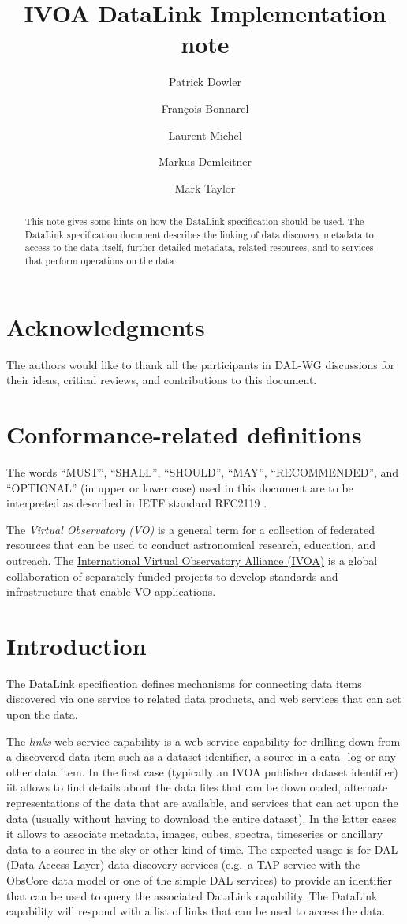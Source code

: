 \documentclass[11pt,a4paper]{ivoa}
\title{IVOA DataLink Implementation note}
\author[http://www.ivoa.net/twiki/bin/view/IVOA/PatrickDowler]
       {Patrick Dowler}
\author[http://www.ivoa.net/twiki/bin/view/IVOA/FrancoisBonnarel]
       {Fran\c{c}ois Bonnarel}
\author[http://www.ivoa.net/twiki/bin/view/IVOA/LaurentMichel]
       {Laurent Michel}
\author[http://www.ivoa.net/twiki/bin/view/IVOA/MarkusDemleitner]
       {Markus Demleitner}
\author[http://www.ivoa.net/twiki/bin/view/IVOA/MarkTaylor]
       {Mark Taylor}
\begin{document}
\begin{abstract}
This note gives some hints on how the DataLink specification should be used.
The DataLink specification document \citep{std:DataLink} describes the linking of data discovery metadata
to access to the data itself, further detailed metadata, related
resources, and to services that perform operations on the data. 
\end{abstract}


\section*{Acknowledgments}

The authors would like to thank all the participants in DAL-WG discussions
for their ideas, critical reviews, and contributions to this document.


\section*{Conformance-related definitions}

The words ``MUST'', ``SHALL'', ``SHOULD'', ``MAY'', ``RECOMMENDED'', and
``OPTIONAL'' (in upper or lower case) used in this document are to be
interpreted as described in IETF standard RFC2119 \citep{std:RFC2119}.

The \emph{Virtual Observatory (VO)} is a
general term for a collection of federated resources that can be used
to conduct astronomical research, education, and outreach.
The \href{http://www.ivoa.net}{International
Virtual Observatory Alliance (IVOA)} is a global
collaboration of separately funded projects to develop standards and
infrastructure that enable VO applications.


\section{Introduction}

The DataLink  specification \citep{std:DataLink} defines mechanisms for connecting data items discovered
via one service to  related data products, and web services
that can act upon the data.

The {\em links\/} web service capability is a web service capability
for drilling
down from a discovered data item such as  a dataset identifier, a source in a cata-
log or any other data item. In the first case (typically an IVOA publisher
dataset identifier) iit allows to find details about the data files that can be
downloaded, alternate representations of the data that are available, and
services that can act upon the data (usually without having to download
the entire dataset). In the latter cases it allows to associate metadata, images,
cubes, spectra, timeseries or ancillary data to a source in the sky or other
kind of time. The expected usage is for DAL (Data Access Layer)
data discovery services (e.g.\ a TAP service \citep{2010ivoa.spec.0327D}
with the ObsCore \citep{2017ivoa.spec.0509L} data
model or one of the simple DAL services) to provide an identifier that
can be used to query the associated DataLink capability. The DataLink
capability will respond with a list of links that can be used to access
the data. 
\end{document}
